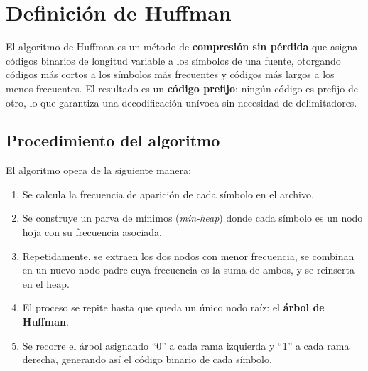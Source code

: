 \chapter*{Definición de Huffman}


El algoritmo de Huffman es un método de \textbf{compresión sin pérdida} que asigna códigos binarios de longitud variable a los símbolos de una fuente, otorgando códigos más cortos a los símbolos más frecuentes y códigos más largos a los menos frecuentes. El resultado es un \textbf{código prefijo}: ningún código es prefijo de otro, lo que garantiza una decodificación unívoca sin necesidad de delimitadores.

\section*{Procedimiento del algoritmo}


El algoritmo opera de la siguiente manera:
\begin{enumerate}
    \item Se calcula la frecuencia de aparición de cada símbolo en el archivo.
    \item Se construye un parva de mínimos (\textit{min-heap}) donde cada símbolo es un nodo hoja con su frecuencia asociada.
    \item Repetidamente, se extraen los dos nodos con menor frecuencia, se combinan en un nuevo nodo padre cuya frecuencia es la suma de ambos, y se reinserta en el heap.
    \item El proceso se repite hasta que queda un único nodo raíz: el \textbf{árbol de Huffman}.
    \item Se recorre el árbol asignando ``0'' a cada rama izquierda y ``1'' a cada rama derecha, generando así el código binario de cada símbolo.
\end{enumerate}



